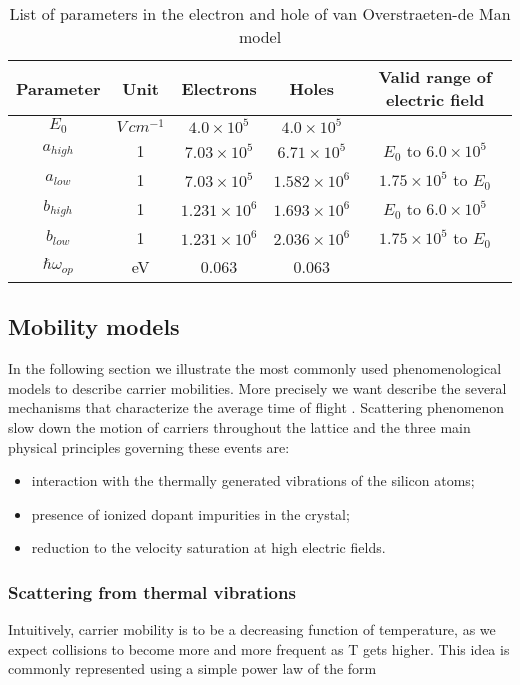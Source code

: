 \begin{table}[!h]
\centering
\begin{tabular}{ccccc}
\toprule
Parameter & Unit & Electrons & Holes  & Valid range of electric field\\
\midrule
$E_0$ & $V \, cm^{-1}$ & $4.0 \times 10^{5}$ & $4.0 \times 10^{5}$ & \\
$a_{high}$ & 1 & $7.03 \times 10^{5}$ & $6.71 \times 10^{5}$ & $E_0$ to $6.0 \times 10^{5}$\\
$a_{low}$ & 1 & $7.03 \times 10^{5}$ & $1.582 \times 10^{6}$ & $1.75 \times 10^{5}$ to $E_0$\\
$b_{high}$ & 1 & $1.231 \times 10^{6}$ & $1.693 \times 10^{6}$ & $E_0$ to $6.0 \times 10^{5}$\\
$b_{low}$ & 1 & $1.231 \times 10^{6}$ & $2.036 \times 10^{6}$ &$1.75 \times 10^{5}$ to $E_0$\\
$\hbar\omega_{op}$ & eV & 0.063 & 0.063\\
\bottomrule
\end{tabular}
\caption{List of parameters in the electron and hole of van Overstraeten-de Man model}
\end{table}

\subsection{Mobility models}

In the following section we illustrate the most commonly used phenomenological models to describe carrier mobilities. More precisely we want describe  the several mechanisms that characterize the average time of flight .
Scattering phenomenon slow down the motion of carriers throughout the lattice and the three main physical principles governing these events are:
\begin{itemize}
\item interaction with the thermally generated vibrations of the silicon atoms;
\item presence of ionized dopant impurities in the crystal;
\item reduction to the velocity saturation at high electric fields.
\end{itemize}

\subsubsection{Scattering from thermal vibrations}

Intuitively, carrier mobility is to be a decreasing function of temperature, as we expect collisions to become more and more frequent as T gets higher. This idea is commonly represented using a simple power law of the form

